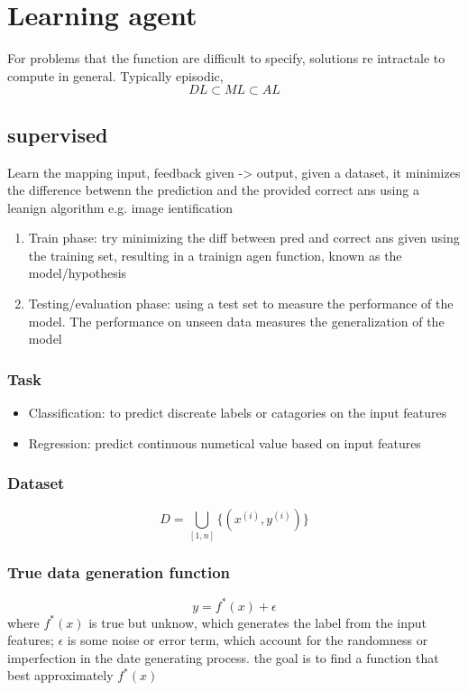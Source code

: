 \documentclass{article}
\begin{document}
\section{Learning agent }
For problems that the function are difficult to specify, solutions re intractale to compute in general. Typically episodic, 
\[DL\subset ML\subset AL\]
\subsection{supervised}
Learn the mapping input, feedback given -> output, given a dataset, 
it minimizes the difference betwenn the prediction and the provided correct ans
using a leanign algorithm  e.g. image ientification
\begin{enumerate}
    \item Train phase: try minimizing the diff between pred and correct ans given using the training set, 
    resulting in a trainign agen function, known as the model/hypothesis
    \item Testing/evaluation phase: using a test set to measure the performance of the model. 
    The performance on unseen data measures the generalization of the model 
\end{enumerate}



\subsubsection*{Task}
\begin{itemize}
    \item Classification: to predict discreate labels or catagories on the input features
    \item Regression: predict continuous numetical value based on input features
\end{itemize}
\subsubsection*{Dataset}
\[D = \bigcup_{[1, n]}\{ (x^{(i)}, y^{(i)})\}\]
\subsubsection*{True data generation function}
\[y = f^*(x) + \epsilon\]
where $f^*(x)$ is true but unknow, which generates the label from the input features; $\epsilon$ is some noise or error term, which account for the randomness or imperfection in the date generating process. \newline
the goal is to find a function that best approximately $f^*(x)$
\end{document}
